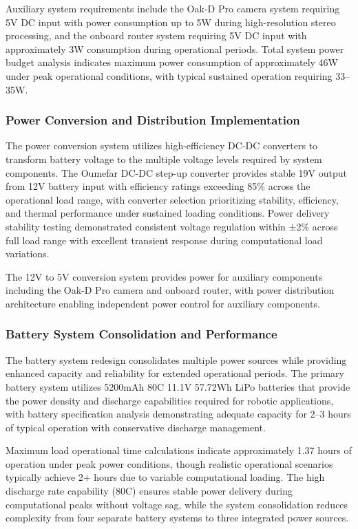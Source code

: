 Auxiliary system requirements include the Oak-D Pro camera system requiring 5V DC input with power consumption up to 5W during high-resolution stereo processing, and the onboard router system requiring 5V DC input with approximately 3W consumption during operational periods. Total system power budget analysis indicates maximum power consumption of approximately 46W under peak operational conditions, with typical sustained operation requiring 33--35W.

\subsubsection{Power Conversion and Distribution Implementation}

The power conversion system utilizes high-efficiency DC-DC converters to transform battery voltage to the multiple voltage levels required by system components. The Oumefar DC-DC step-up converter provides stable 19V output from 12V battery input with efficiency ratings exceeding 85\% across the operational load range, with converter selection prioritizing stability, efficiency, and thermal performance under sustained loading conditions. Power delivery stability testing demonstrated consistent voltage regulation within ±2\% across full load range with excellent transient response during computational load variations.

The 12V to 5V conversion system provides power for auxiliary components including the Oak-D Pro camera and onboard router, with power distribution architecture enabling independent power control for auxiliary components. 

\subsubsection{Battery System Consolidation and Performance}

The battery system redesign consolidates multiple power sources while providing enhanced capacity and reliability for extended operational periods. The primary battery system utilizes 5200mAh 80C 11.1V 57.72Wh LiPo batteries that provide the power density and discharge capabilities required for robotic applications, with battery specification analysis demonstrating adequate capacity for 2--3 hours of typical operation with conservative discharge management.

Maximum load operational time calculations indicate approximately 1.37 hours of operation under peak power conditions, though realistic operational scenarios typically achieve 2+ hours due to variable computational loading. The high discharge rate capability (80C) ensures stable power delivery during computational peaks without voltage sag, while the system consolidation reduces complexity from four separate battery systems to three integrated power sources.

